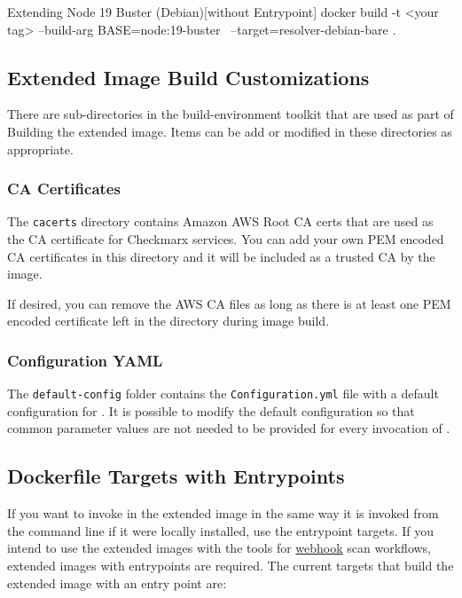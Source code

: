 \begin{code}{Extending Node 19 Buster (Debian)}{[without Entrypoint]}{}
docker build -t <your tag> --build-arg BASE=node:19-buster \
    --target=resolver-debian-bare .
\end{code}

\subsection{Extended Image Build Customizations}

There are sub-directories in the build-environment toolkit that are used as part of Building
the extended image.  Items can be add or modified in these directories as appropriate.

\subsubsection{CA Certificates}

The \texttt{cacerts} directory contains Amazon AWS Root CA certs that are used as the CA 
certificate for Checkmarx services.  You can add your own PEM encoded CA certificates in this
directory and it will be included as a trusted CA by the image.

If desired, you can remove the AWS CA files as long as there is at least one PEM
encoded certificate left in the directory during image build.

\subsubsection{\scaresolver Configuration YAML}

The \texttt{default-config} folder contains the \texttt{Configuration.yml} file with a default
configuration for \scaresolver.  It is possible to modify the default configuration so that
common parameter values are not needed to be provided for every invocation of \scaresolver.

\subsection{Dockerfile Targets with Entrypoints}\label{ssec:entrypoint_targets}

If you want to invoke \scaresolver in the extended image in the same way it is invoked from the command
line if it were locally installed, use the entrypoint targets.  If you intend to use the
extended images with the \cxtoolkit 
tools for \hyperref[chap:build_env_affinity]{webhook} scan workflows, extended
images with entrypoints are required.  The current targets that build the extended
image with an entry point are:

